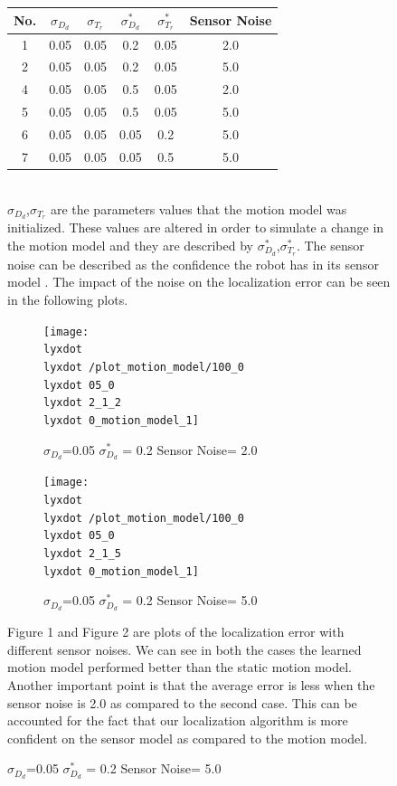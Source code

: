 \documentclass[12pt,draft]{dalcsthesis}
\begin{document}
{{\begin{figure}
{\begin{tabular}{|c|c|c|c|c|c|}
\hline 
No. & $\sigma_{D_{d}}$ & $\sigma_{T_{r}}$ & $\sigma_{D_{d}}^{*}$ & $\sigma_{T_{r}}^{*}$ & Sensor Noise\tabularnewline
\hline 
\hline 
1 & 0.05 & 0.05 & 0.2 & 0.05 & 2.0\tabularnewline
\hline 
2 & 0.05 & 0.05 & 0.2 & 0.05 & 5.0\tabularnewline
\hline 
4 & 0.05 & 0.05 & 0.5 & 0.05 & 2.0\tabularnewline
\hline 
5 & 0.05 & 0.05 & 0.5 & 0.05 & 5.0\tabularnewline
\hline 
6 & 0.05 & 0.05 & 0.05 & 0.2 & 5.0\tabularnewline
\hline 
7 & 0.05 & 0.05 & 0.05 & 0.5 & 5.0\tabularnewline
\hline 
\end{tabular}
\\

$\sigma_{D_{d}}$,$\sigma_{T_{r}}$ are the parameters values that
the motion model was initialized. These values are altered in order
to simulate a change in the motion model and they are described by
$\sigma_{D_{d}}^{*}$,$\sigma_{T_{r}}^{*}$. The sensor noise can
be described as the confidence the robot has in its sensor model .
The impact of the noise on the localization error can be seen in the
following plots.	

\begin{figure}
\caption{$\sigma_{D_{d}}$=0.05 $\sigma_{D_{d}}^{*}$ = 0.2 Sensor Noise= 2.0}


\texttt{[image: \\lyxdot \\lyxdot /plot\_motion\_model/100\_0\\lyxdot 05\_0\\lyxdot 2\_1\_2\\lyxdot 0\_motion\_model\_1]}
\end{figure}


\begin{figure}
\caption{$\sigma_{D_{d}}$=0.05 $\sigma_{D_{d}}^{*}$ = 0.2 Sensor Noise= 5.0}


\texttt{[image: \\lyxdot \\lyxdot /plot\_motion\_model/100\_0\\lyxdot 05\_0\\lyxdot 2\_1\_5\\lyxdot 0\_motion\_model\_1]}

\end{figure}


Figure 1 and Figure 2 are plots of the localization error with different
sensor noises. We can see in both the cases the learned motion model
performed better than the static motion model. Another important point
is that the average error is less when the sensor noise is 2.0 as
compared to the second case. This can be accounted for the fact that
our localization algorithm is more confident on the sensor model as
compared to the motion model. 

}
\end{figure}}}
\end{document}
